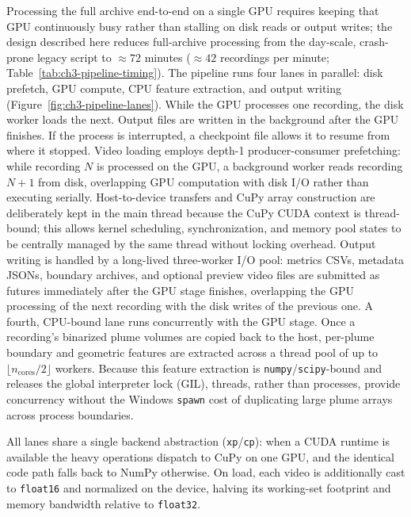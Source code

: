 Processing the full archive end-to-end on a single GPU requires keeping that GPU continuously busy rather than stalling on disk reads or output writes; the design described here reduces full-archive processing from the day-scale, crash-prone legacy script to ${\approx}72$ minutes (${\approx}42$ recordings per minute; Table~\ref{tab:ch3-pipeline-timing}). The pipeline runs four lanes in parallel: disk prefetch, GPU compute, CPU feature extraction, and output writing (Figure~\ref{fig:ch3-pipeline-lanes}). While the GPU processes one recording, the disk worker loads the next. Output files are written in the background after the GPU finishes. If the process is interrupted, a checkpoint file allows it to resume from where it stopped.
Video loading employs depth-1 producer-consumer prefetching: while recording \(N\) is processed on the GPU, a background worker reads recording \(N+1\) from disk, overlapping GPU computation with disk I/O rather than executing serially.
Host-to-device transfers and CuPy array construction are deliberately kept in the main thread because the CuPy CUDA context is thread-bound; this allows kernel scheduling, synchronization, and memory pool states to be centrally managed by the same thread without locking overhead.
Output writing is handled by a long-lived three-worker I/O pool: metrics CSVs, metadata JSONs, boundary archives, and optional preview video files are submitted as futures immediately after the GPU stage finishes, overlapping the GPU processing of the next recording with the disk writes of the previous one.
A fourth, CPU-bound lane runs concurrently with the GPU stage. Once a recording's binarized plume volumes are copied back to the host, per-plume boundary and geometric features are extracted across a thread pool of up to \(\lfloor n_{\mathrm{cores}}/2\rfloor\) workers. Because this feature extraction is \texttt{numpy}/\texttt{scipy}-bound and releases the global interpreter lock (GIL), threads, rather than processes, provide concurrency without the Windows \texttt{spawn} cost of duplicating large plume arrays across process boundaries.

All lanes share a single backend abstraction (\texttt{xp}/\texttt{cp}): when a CUDA runtime is available the heavy operations dispatch to CuPy on one GPU, and the identical code path falls back to NumPy otherwise. On load, each video is additionally cast to \texttt{float16} and normalized on the device, halving its working-set footprint and memory bandwidth relative to \texttt{float32}.

